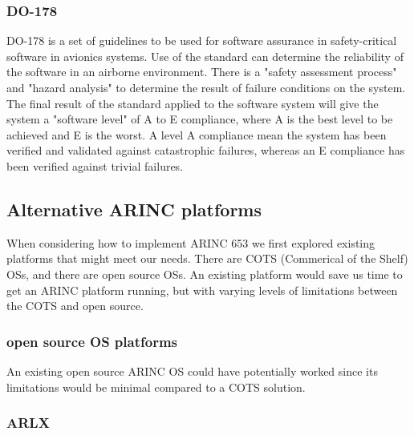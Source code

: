 \subsubsection{DO-178}
DO-178 is a set of guidelines to be used for software assurance in safety-critical software in avionics systems. Use of the standard can determine the reliability of the software in an airborne environment. There is a "safety assessment process" and "hazard analysis" to determine the result of failure conditions on the system. The final result of the standard applied to the software system will give the system a "software level" of A to E compliance, where A is the best level to be achieved and E is the worst. A level A compliance mean the system has been verified and validated against catastrophic failures, whereas an E compliance has been verified against trivial failures.


\subsection{Alternative ARINC platforms}

When considering how to implement ARINC 653 we first explored existing platforms that might meet our needs. There are COTS (Commerical of the Shelf) OSs, and there are open source OSs. An existing platform would save us time to get an ARINC platform running, but with varying levels of limitations between the COTS and open source. 

\subsubsection{open source OS platforms}

An existing open source ARINC OS could have potentially worked since its limitations would be minimal compared to a COTS solution. %

\subsubsection{ARLX}

